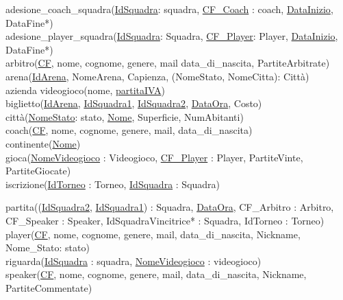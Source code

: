 \documentclass[a4paper,12pt]{report}
\begin{document}
adesione\_coach\_squadra(\underline{IdSquadra}: squadra, \underline{CF\_Coach} : coach, \underline{DataInizio}, DataFine*) \\

adesione\_player\_squadra(\underline{IdSquadra}: Squadra, \underline{CF\_Player}: Player, \underline{DataInizio}, DataFine*) \\

arbitro(\underline{CF}, nome, cognome, genere, mail data\_di\_nascita, PartiteArbitrate) \\

arena(\underline{IdArena}, NomeArena, Capienza, (NomeStato, NomeCitta): Città) \\

azienda videogioco(nome, \underline{partitaIVA}) \\

biglietto(\underline{IdArena}, \underline{IdSquadra1}, \underline{IdSquadra2}, \underline{DataOra}, Costo) \\

città(\underline{NomeStato}: stato, \underline{Nome}, Superficie, NumAbitanti) \\

coach(\underline{CF}, nome, cognome, genere, mail, data\_di\_nascita) \\

continente(\underline{Nome}) \\

gioca(\underline{NomeVideogioco} : Videogioco, \underline{CF\_Player} : Player, PartiteVinte, PartiteGiocate) \\

iscrizione(\underline{IdTorneo} : Torneo, \underline{IdSquadra} : Squadra)

partita((\underline{IdSquadra2}, \underline{IdSquadra1}) : Squadra, \underline{DataOra}, CF\_Arbitro : Arbitro, CF\_Speaker : Speaker, IdSquadraVincitrice* : Squadra, IdTorneo : Torneo) \\

player(\underline{CF}, nome, cognome, genere, mail, data\_di\_nascita, Nickname, Nome\_Stato: stato) \\

riguarda(\underline{IdSquadra} : squadra, \underline{NomeVideogioco} : videogioco) \\

speaker(\underline{CF}, nome, cognome, genere, mail, data\_di\_nascita, Nickname, PartiteCommentate) \\
\end{document}
